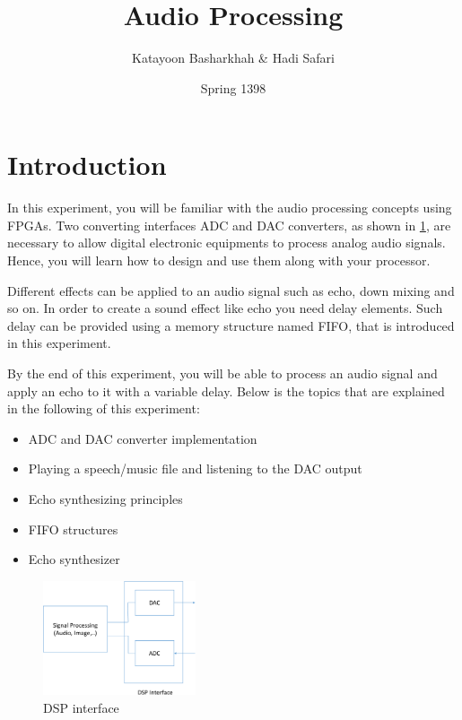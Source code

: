 \documentclass[12pt, logo=tehranDLDL/ut]{tehranDLDL}
\title{Audio Processing}
\author{Katayoon Basharkhah \& Hadi Safari}
\date{Spring 1398}
\begin{document}
\maketitle

\tableofcontents
\newpage

\section*{Introduction}

In this experiment, you will be familiar with the audio processing concepts using FPGAs. Two converting interfaces ADC and DAC converters, as shown in \ref{fig:dsp}, are necessary to allow digital electronic equipments to process analog audio signals. Hence, you will learn how to design and use them along with your processor.

Different effects can be applied to an audio signal such as echo, down mixing and so on. In order to create a sound effect like echo you need delay elements. Such delay can be provided using a memory structure named FIFO, that is introduced in this experiment.

By the end of this experiment, you will be able to process an audio signal and apply an echo to it with a variable delay. Below is the topics that are explained in the following of this experiment:

\begin{itemize}
    \item ADC and DAC converter implementation
    \item Playing a speech/music file and listening to the DAC output
    \item Echo synthesizing principles
    \item FIFO structures
    \item Echo synthesizer
\end{itemize}

\begin{figure}[b]
    \centering
    \caption{DSP interface\label{fig:dsp}}
    \includegraphics[width=0.4\textwidth]{dsp}
\end{figure}
\end{document}
